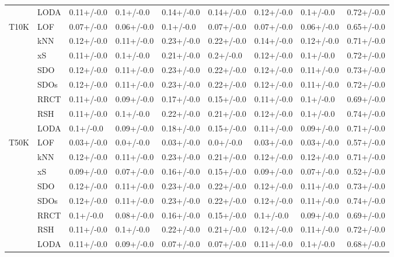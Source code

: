 \begin{table}
\begin{tabular}{lllllllll}
      & LODA &   0.11+/-0.0 &    0.1+/-0.0 &   0.14+/-0.0 &   0.14+/-0.0 &   0.12+/-0.0 &    0.1+/-0.0 &   0.72+/-0.0 \\
T10K & LOF &   0.07+/-0.0 &   0.06+/-0.0 &    0.1+/-0.0 &   0.07+/-0.0 &   0.07+/-0.0 &   0.06+/-0.0 &   0.65+/-0.0 \\
      & kNN &   0.12+/-0.0 &   0.11+/-0.0 &   0.23+/-0.0 &   0.22+/-0.0 &   0.14+/-0.0 &   0.12+/-0.0 &   0.71+/-0.0 \\
      & xS &   0.11+/-0.0 &    0.1+/-0.0 &   0.21+/-0.0 &    0.2+/-0.0 &   0.12+/-0.0 &    0.1+/-0.0 &   0.72+/-0.0 \\
      & SDO &   0.12+/-0.0 &   0.11+/-0.0 &   0.23+/-0.0 &   0.22+/-0.0 &   0.12+/-0.0 &   0.11+/-0.0 &   0.73+/-0.0 \\
      & SDOs &   0.12+/-0.0 &   0.11+/-0.0 &   0.23+/-0.0 &   0.22+/-0.0 &   0.12+/-0.0 &   0.11+/-0.0 &   0.72+/-0.0 \\
      & RRCT &   0.11+/-0.0 &   0.09+/-0.0 &   0.17+/-0.0 &   0.15+/-0.0 &   0.11+/-0.0 &    0.1+/-0.0 &   0.69+/-0.0 \\
      & RSH &   0.11+/-0.0 &    0.1+/-0.0 &   0.22+/-0.0 &   0.21+/-0.0 &   0.12+/-0.0 &    0.1+/-0.0 &   0.74+/-0.0 \\
      & LODA &    0.1+/-0.0 &   0.09+/-0.0 &   0.18+/-0.0 &   0.15+/-0.0 &   0.11+/-0.0 &   0.09+/-0.0 &   0.71+/-0.0 \\
T50K & LOF &   0.03+/-0.0 &    0.0+/-0.0 &   0.03+/-0.0 &    0.0+/-0.0 &   0.03+/-0.0 &   0.03+/-0.0 &   0.57+/-0.0 \\
      & kNN &   0.12+/-0.0 &   0.11+/-0.0 &   0.23+/-0.0 &   0.21+/-0.0 &   0.12+/-0.0 &   0.12+/-0.0 &   0.71+/-0.0 \\
      & xS &   0.09+/-0.0 &   0.07+/-0.0 &   0.16+/-0.0 &   0.15+/-0.0 &   0.09+/-0.0 &   0.07+/-0.0 &   0.52+/-0.0 \\
      & SDO &   0.12+/-0.0 &   0.11+/-0.0 &   0.23+/-0.0 &   0.22+/-0.0 &   0.12+/-0.0 &   0.11+/-0.0 &   0.73+/-0.0 \\
      & SDOs &   0.12+/-0.0 &   0.11+/-0.0 &   0.23+/-0.0 &   0.22+/-0.0 &   0.12+/-0.0 &   0.11+/-0.0 &   0.74+/-0.0 \\
      & RRCT &    0.1+/-0.0 &   0.08+/-0.0 &   0.16+/-0.0 &   0.15+/-0.0 &    0.1+/-0.0 &   0.09+/-0.0 &   0.69+/-0.0 \\
      & RSH &   0.11+/-0.0 &    0.1+/-0.0 &   0.22+/-0.0 &   0.21+/-0.0 &   0.12+/-0.0 &   0.11+/-0.0 &   0.72+/-0.0 \\
      & LODA &   0.11+/-0.0 &   0.09+/-0.0 &   0.07+/-0.0 &   0.07+/-0.0 &   0.11+/-0.0 &    0.1+/-0.0 &   0.68+/-0.0 \\

\end{tabular}
\end{table}

